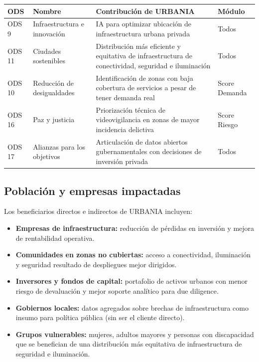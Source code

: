 \documentclass[12pt,a4paper]{article}
\begin{document}
\begin{table}[H]
\centering
\small
\renewcommand{\arraystretch}{1.3}
\begin{tabularx}{\textwidth}{l l X l}
\toprule
\rowcolor{grisoscuro}
\color{white}\textbf{ODS} & \color{white}\textbf{Nombre} & \color{white}\textbf{Contribución de URBANIA} & \color{white}\textbf{Módulo} \\
\midrule
ODS 9 & Infraestructura e innovación & IA para optimizar ubicación de infraestructura urbana privada & Todos \\
\rowcolor{fondofila}
ODS 11 & Ciudades sostenibles & Distribución más eficiente y equitativa de infraestructura de conectividad, seguridad e iluminación & Todos \\
ODS 10 & Reducción de desigualdades & Identificación de zonas con baja cobertura de servicios a pesar de tener demanda real & Score Demanda \\
\rowcolor{fondofila}
ODS 16 & Paz y justicia & Priorización técnica de videovigilancia en zonas de mayor incidencia delictiva & Score Riesgo \\
ODS 17 & Alianzas para los objetivos & Articulación de datos abiertos gubernamentales con decisiones de inversión privada & Todos \\
\bottomrule
\end{tabularx}
\end{table}

\subsection{Población y empresas impactadas}

Los beneficiarios directos e indirectos de URBANIA incluyen:

\begin{itemize}[leftmargin=1.5cm, itemsep=3pt]
  \item \textbf{Empresas de infraestructura:} reducción de pérdidas en inversión y mejora de rentabilidad operativa.
  \item \textbf{Comunidades en zonas no cubiertas:} acceso a conectividad, iluminación y seguridad resultado de despliegues mejor dirigidos.
  \item \textbf{Inversores y fondos de capital:} portafolio de activos urbanos con menor riesgo de devaluación y mejor soporte analítico para due diligence.
  \item \textbf{Gobiernos locales:} datos agregados sobre brechas de infraestructura como insumo para política pública (sin ser el cliente directo).
  \item \textbf{Grupos vulnerables:} mujeres, adultos mayores y personas con discapacidad que se benefician de una distribución más equitativa de infraestructura de seguridad e iluminación.
\end{itemize}
\end{document}
